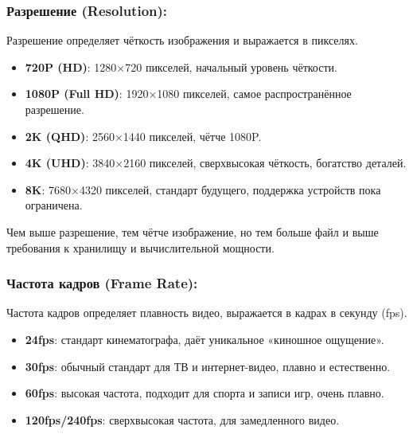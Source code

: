 


\subsubsection*{Разрешение (Resolution):}

Разрешение определяет чёткость изображения и выражается в пикселях.

\begin{itemize}
  \item \textbf{720P (HD)}: 1280×720 пикселей, начальный уровень чёткости.
  \item \textbf{1080P (Full HD)}: 1920×1080 пикселей, самое распространённое разрешение.
  \item \textbf{2K (QHD)}: 2560×1440 пикселей, чётче 1080P.
  \item \textbf{4K (UHD)}: 3840×2160 пикселей, сверхвысокая чёткость, богатство деталей.
  \item \textbf{8K}: 7680×4320 пикселей, стандарт будущего, поддержка устройств пока ограничена.
\end{itemize}

Чем выше разрешение, тем чётче изображение, но тем больше файл и выше требования к хранилищу и вычислительной мощности.

\subsubsection*{Частота кадров (Frame Rate):}

Частота кадров определяет плавность видео, выражается в кадрах в секунду (fps).

\begin{itemize}
  \item \textbf{24fps}: стандарт кинематографа, даёт уникальное «киношное ощущение».
  \item \textbf{30fps}: обычный стандарт для ТВ и интернет-видео, плавно и естественно.
  \item \textbf{60fps}: высокая частота, подходит для спорта и записи игр, очень плавно.
  \item \textbf{120fps/240fps}: сверхвысокая частота, для замедленного видео.
\end{itemize}

